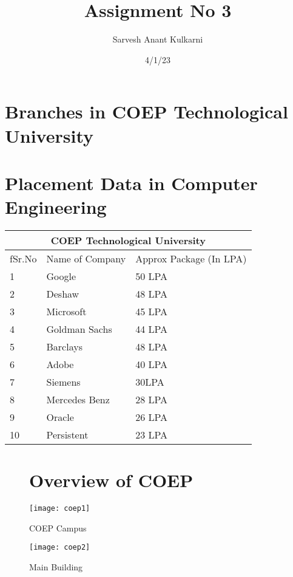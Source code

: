 \documentclass[12pt]{article}
\title{Assignment No 3}
\date{4/1/23}
\author{Sarvesh Anant Kulkarni}
\begin{document}
\maketitle
\tableofcontents
\newpage
\centering
\section{Branches in COEP Technological University }
\vspace{2cm}

\large

\newpage
\section{Placement Data in Computer Engineering }
\vspace{2cm}
\begin{tabular}{ |p{1cm}|p{5cm}|p{4cm}|  }

\hline
\multicolumn{3}{|c|}{COEP Technological University} \\
\hline
fSr.No & Name of Company & Approx Package (In LPA) \\
\hline
1 & Google & 50 LPA \\
 \hline
2 & Deshaw  & 48 LPA \\
 \hline
3 & Microsoft & 45 LPA \\
 \hline
4 & Goldman Sachs  & 44  LPA \\
 \hline
5  & Barclays & 48 LPA \\
 \hline
6 & Adobe & 40 LPA   \\
 \hline
7 & Siemens & 30LPA \\
 \hline
8 & Mercedes Benz & 28 LPA \\
 \hline
9 & Oracle & 26 LPA \\
 \hline
10 & Persistent & 23 LPA \\

\hline
\end{tabular}
\newpage

\begin{figure}[h]
\centering
\section{Overview of COEP }
\texttt{[image: coep1]}
\caption{COEP Campus}

\texttt{[image: coep2]}
\caption{Main Building}

\pagebreak
\end{figure}
\end{document}
